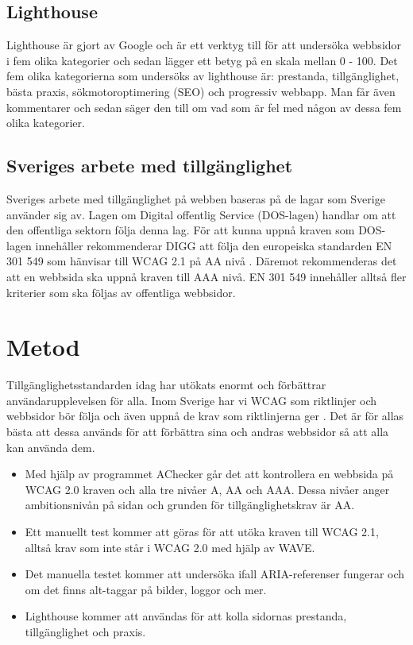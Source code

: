 \documentclass[11p]{article}
\begin{document}
    \subsection{Lighthouse}
    Lighthouse är gjort av Google och är ett verktyg till för att undersöka webbsidor i fem olika kategorier och sedan lägger ett betyg på en skala mellan 0 - 100.
    Det fem olika kategorierna som undersöks av lighthouse är: prestanda, tillgänglighet, bästa praxis, sökmotoroptimering (SEO) och progressiv webbapp.
    Man får även kommentarer och sedan säger den till om vad som är fel med någon av dessa fem olika kategorier.
    
    \subsection{Sveriges arbete med tillgänglighet}
    Sveriges arbete med tillgänglighet på webben baseras på de lagar som Sverige använder sig av.
    Lagen om Digital offentlig Service (DOS-lagen) handlar om att den offentliga sektorn följa denna lag.
    För att kunna uppnå kraven som DOS-lagen innehåller rekommenderar DIGG att följa den europeiska standarden EN 301 549 som hänvisar till WCAG 2.1 på AA nivå \textcite{Digg_Dos}.
    Däremot rekommenderas det att en webbsida ska uppnå kraven till AAA nivå.
    EN 301 549 innehåller alltså fler kriterier som ska följas av offentliga webbsidor.

    \section{Metod}
    Tillgänglighetsstandarden idag har utökats enormt och förbättrar användarupplevelsen för alla.
    Inom Sverige har vi WCAG som riktlinjer och webbsidor bör följa och även uppnå de krav som riktlinjerna ger \textcite{Digg}.
    Det är för allas bästa att dessa används för att förbättra sina och andras webbsidor så att alla kan använda dem.

    \begin{itemize}
        \item Med hjälp av programmet AChecker går det att kontrollera en webbsida på WCAG 2.0 kraven och alla tre nivåer A, AA och AAA. Dessa nivåer anger ambitionsnivån på sidan och grunden för tillgänglighetskrav är AA.
        \item Ett manuellt test kommer att göras för att utöka kraven till WCAG 2.1, alltså krav som inte står i WCAG 2.0 med hjälp av WAVE.
        \item Det manuella testet kommer att undersöka ifall ARIA-referenser fungerar och om det finns alt-taggar på bilder, loggor och mer.
        \item Lighthouse kommer att användas för att kolla sidornas prestanda, tillgänglighet och praxis.
    \end{itemize}
\end{document}
